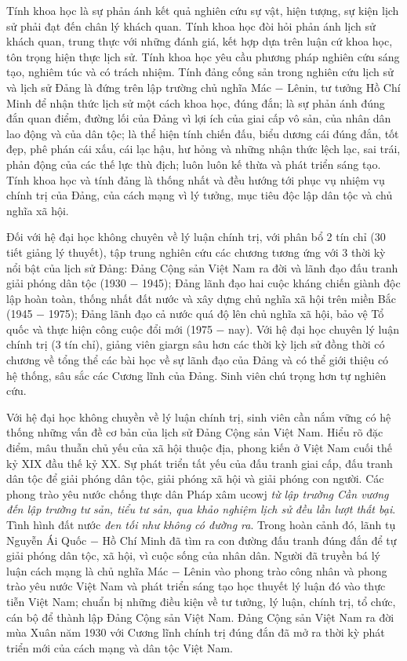 Tính khoa học là sự phản ánh kết quả nghiên cứu sự vật, hiện tượng, sự kiện lịch sử phải đạt đến chân lý khách quan. Tính khoa học đòi hỏi phản ánh lịch sử khách quan, trung thực với những đánh giá, kết hợp dựa trên luận cứ khoa học, tôn trọng hiện thực lịch sử. Tính khoa học yêu cầu phương pháp nghiên cứu sáng tạo, nghiêm túc và có trách nhiệm. Tính đảng cống sản trong nghiên cứu lịch sử và lịch sử Đảng là đứng trên lập trường chủ nghĩa Mác $-$ Lênin, tư tưởng Hồ Chí Minh để nhận thức lịch sử một cách khoa học, đúng đắn; là sự phản ánh đúng đắn quan điểm, đường lối của Đảng vì lợi ích của giai cấp vô sản, của nhân dân lao động và của dân tộc; là thể hiện tính chiến đấu, biểu dương cái đúng đắn, tốt đẹp, phê phán cái xấu, cái lạc hậu, hư hỏng và những nhận thức lệch lạc, sai trái, phản động của các thế lực thù địch; luôn luôn kế thừa và phát triển sáng tạo. Tính khoa học và tính đảng là thống nhất và đều hướng tới phục vụ nhiệm vụ chính trị của Đảng, của cách mạng vì lý tưởng, mục tiêu độc lập dân tộc và chủ nghĩa xã hội.

Đối với hệ đại học không chuyên về lý luận chính trị, với phân bổ 2 tín chỉ (30 tiết giảng lý thuyết), tập trung nghiên cứu các chương tương ứng với 3 thời kỳ nổi bật của lịch sử Đảng: Đảng Cộng sản Việt Nam ra đời và lãnh đạo đấu tranh giải phóng dân tộc (1930 $-$ 1945); Đảng lãnh đạo hai cuộc kháng chiến giành độc lập hoàn toàn, thống nhất đất nước và xây dựng chủ nghĩa xã hội trên miền Bắc (1945 $-$ 1975); Đảng lãnh đạo cả nước quá độ lên chủ nghĩa xã hội, bảo vệ Tổ quốc và thực hiện công cuộc đổi mới (1975 $-$ nay). Với hệ đại học chuyên lý luận chính trị (3 tín chỉ), giảng viên giargn sâu hơn các thời kỳ lịch sử đồng thời có chương về tổng thể các bài học về sự lãnh đạo của Đảng và có thể giới thiệu có hệ thống, sâu sắc các Cương lĩnh của Đảng. Sinh viên chú trọng hơn tự nghiên cứu.

Với hệ đại học không chuyền về lý luận chính trị, sinh viên cần nắm vững có hệ thống những vấn đề cơ bản của lịch sử Đảng Cộng sản Việt Nam. Hiểu rõ đặc điểm, mâu thuẫn chủ yếu của xã hội thuộc địa, phong kiến ở Việt Nam cuối thế kỷ XIX đầu thế kỷ XX. Sự phát triển tất yếu của đấu tranh giai cấp, đấu tranh dân tộc để giải phóng dân tộc, giải phóng xã hội và giải phóng con người. Các phong trào yêu nước chống thực dân Pháp xâm ucowj \textit{từ lập trường Cần vương đến lập trường tư sản, tiểu tư sản, qua khảo nghiệm lịch sử đều lần lượt thất bại}. Tình hình đất nước \textit{đen tối như không có đường ra}. Trong hoàn cảnh đó, lãnh tụ Nguyễn Ái Quốc $-$ Hồ Chí Minh đã tìm ra con đường đấu tranh đúng đắn để tự giải phóng dân tộc, xã hội, vì cuộc sống của nhân dân. Người đã truyền bá lý luận cách mạng là chủ nghĩa Mác $-$ Lênin vào phong trào công nhân và phong trào yêu nước Việt Nam và phát triển sáng tạo học thuyết lý luận đó vào thực tiễn Việt Nam; chuẩn bị những điều kiện về tư tưởng, lý luận, chính trị, tổ chức, cán bộ để thành lập Đảng Cộng sản Việt Nam. Đảng Cộng sản Việt Nam ra đời mùa Xuân năm 1930 với Cương lĩnh chính trị đúng đắn đã mở ra thời kỳ phát triển mới của cách mạng và dân tộc Việt Nam.

